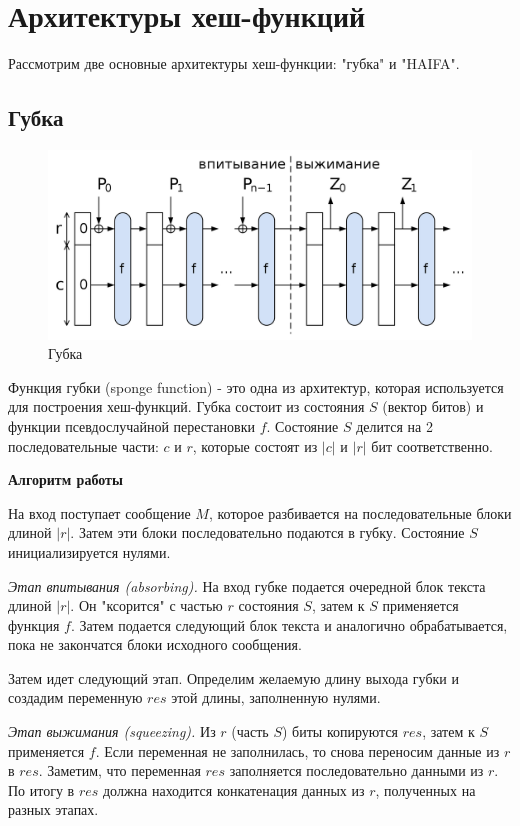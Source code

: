 \documentclass[colorthm]{./civarticle}
\begin{document}
\section{Архитектуры хеш-функций}
Рассмотрим две основные архитектуры хеш-функции: "губка" и "HAIFA".

\subsection{Губка}

\begin{figure}[H]
    \centering
    \includegraphics[width=0.5\linewidth]{SpongeConstruction.svg.png}
    \caption{Губка}
    \label{fig:enter-label}
\end{figure}

Функция губки (sponge function) - это одна из архитектур, которая используется для построения хеш-функций. Губка состоит из состояния $S$ (вектор битов) и функции псевдослучайной перестановки $f$. Состояние $S$ делится на 2 последовательные части: $c$ и $r$, которые состоят из $|c|$ и $|r|$ бит соответственно.

\textbf{Алгоритм работы}

На вход поступает сообщение $M$, которое разбивается на последовательные блоки длиной $|r|$. Затем эти блоки последовательно подаются в губку. Состояние $S$ инициализируется нулями.

\textit{Этап впитывания (absorbing).} На вход губке подается очередной блок текста длиной $|r|$. Он "ксорится" с частью $r$ состояния $S$, затем к $S$ применяется функция $f$. Затем подается следующий блок текста и аналогично обрабатывается, пока не закончатся блоки исходного сообщения.

Затем идет следующий этап. Определим желаемую длину выхода губки и создадим переменную $res$ этой длины, заполненную нулями.

\textit{Этап выжимания (squeezing).} Из $r$ (часть $S$) биты копируются $res$, затем к $S$ применяется $f$. Если переменная не заполнилась, то снова переносим данные из $r$ в $res$. Заметим, что переменная $res$ заполняется последовательно данными из $r$. По итогу в $res$ должна находится конкатенация данных из $r$, полученных на разных этапах. 
\end{document}
